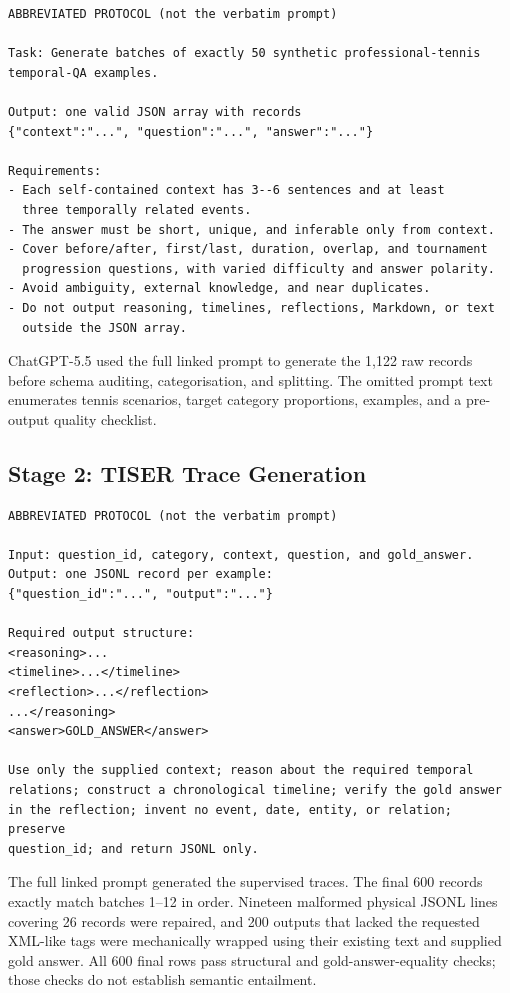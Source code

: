 \documentclass[conference]{IEEEtran}
\begin{document}
\begin{lstlisting}[style=prompt]
ABBREVIATED PROTOCOL (not the verbatim prompt)

Task: Generate batches of exactly 50 synthetic professional-tennis
temporal-QA examples.

Output: one valid JSON array with records
{"context":"...", "question":"...", "answer":"..."}

Requirements:
- Each self-contained context has 3--6 sentences and at least
  three temporally related events.
- The answer must be short, unique, and inferable only from context.
- Cover before/after, first/last, duration, overlap, and tournament
  progression questions, with varied difficulty and answer polarity.
- Avoid ambiguity, external knowledge, and near duplicates.
- Do not output reasoning, timelines, reflections, Markdown, or text
  outside the JSON array.
\end{lstlisting}

ChatGPT-5.5 used the full linked prompt to generate the 1,122 raw records before schema auditing, categorisation, and splitting. The omitted prompt text enumerates tennis scenarios, target category proportions, examples, and a pre-output quality checklist.

\subsection{Stage 2: TISER Trace Generation}

\begin{lstlisting}[style=prompt]
ABBREVIATED PROTOCOL (not the verbatim prompt)

Input: question_id, category, context, question, and gold_answer.
Output: one JSONL record per example:
{"question_id":"...", "output":"..."}

Required output structure:
<reasoning>...
<timeline>...</timeline>
<reflection>...</reflection>
...</reasoning>
<answer>GOLD_ANSWER</answer>

Use only the supplied context; reason about the required temporal
relations; construct a chronological timeline; verify the gold answer
in the reflection; invent no event, date, entity, or relation; preserve
question_id; and return JSONL only.
\end{lstlisting}

The full linked prompt generated the supervised traces. The final 600 records exactly match batches 1--12 in order. Nineteen malformed physical JSONL lines covering 26 records were repaired, and 200 outputs that lacked the requested XML-like tags were mechanically wrapped using their existing text and supplied gold answer. All 600 final rows pass structural and gold-answer-equality checks; those checks do not establish semantic entailment.
\end{document}
